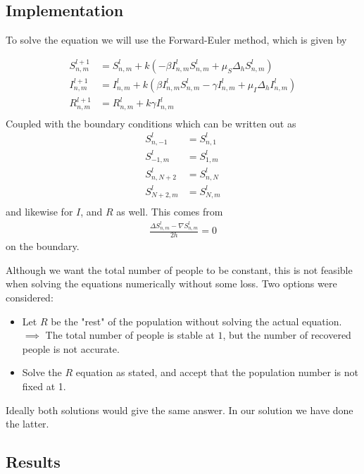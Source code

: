 \subsection{Implementation}
To solve the equation we will use the Forward-Euler method, which is given by

\begin{equation}
    \begin{split}
        S_{n,m}^{l+1} &= S_{n,m}^l + k(-\beta I_{n,m}^l S_{n,m}^l + \mu_S \Delta_h S_{n,m}^l) \\
        I_{n,m}^{l+1} &= I_{n,m}^l + k(\beta I_{n,m}^l S_{n,m}^l - \gamma I_{n,m}^l +  \mu_I \Delta_h I_{n,m}^l) \\
        R_{n,m}^{l+1} &= R_{n,m}^l + k \gamma I_{n,m}^l  \\
    \end{split}
\end{equation}
Coupled with the boundary conditions which can be written out as
\begin{equation}
    \begin{split}
        S_{n,-1}^l &= S_{n, 1}^l \\
        S_{-1,m}^l &= S_{1, m}^l \\
        S_{n,N+2}^l &= S_{n, N}^l \\
        S_{N+2,m}^l &= S_{N, m}^l \\
    \end{split}
\end{equation}
and likewise for $I$, and $R$ as well. This comes from 
\begin{equation}
    \begin{split}
        \frac{\Delta S_{n,m}^l - \nabla S_{n,m}^l}{2h} = 0
    \end{split}
\end{equation}
on the boundary.

Although we want the total number of people to be constant, this is not feasible when solving the equations numerically without some loss. Two options were considered:
\begin{itemize}
    \item Let $R$ be the "rest" of the population without solving the actual equation. $\implies$ The total number of people is stable at $1$, but the number of recovered people is not accurate.
    \item Solve the $R$ equation as stated, and accept that the population number is not fixed at 1.
\end{itemize}
Ideally both solutions would give the same answer.
In our solution we have done the latter.
\subsection{Results}
